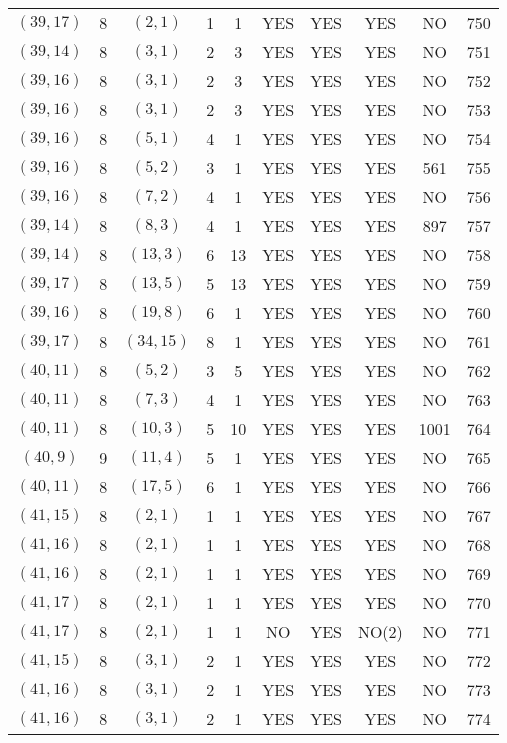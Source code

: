 \begin{longtable}{|c|c|c|c|c|c|c|c|c|c|}
$(39, 17)$ & 8 & $(2, 1)$ & 1 & 1 & YES & YES & YES & NO & 750\\
$(39, 14)$ & 8 & $(3, 1)$ & 2 & 3 & YES & YES & YES & NO & 751\\
$(39, 16)$ & 8 & $(3, 1)$ & 2 & 3 & YES & YES & YES & NO & 752\\
$(39, 16)$ & 8 & $(3, 1)$ & 2 & 3 & YES & YES & YES & NO & 753\\
$(39, 16)$ & 8 & $(5, 1)$ & 4 & 1 & YES & YES & YES & NO & 754\\
$(39, 16)$ & 8 & $(5, 2)$ & 3 & 1 & YES & YES & YES & 561 & 755\\
$(39, 16)$ & 8 & $(7, 2)$ & 4 & 1 & YES & YES & YES & NO & 756\\
$(39, 14)$ & 8 & $(8, 3)$ & 4 & 1 & YES & YES & YES & 897 & 757\\
$(39, 14)$ & 8 & $(13, 3)$ & 6 & 13 & YES & YES & YES & NO & 758\\
$(39, 17)$ & 8 & $(13, 5)$ & 5 & 13 & YES & YES & YES & NO & 759\\
$(39, 16)$ & 8 & $(19, 8)$ & 6 & 1 & YES & YES & YES & NO & 760\\
$(39, 17)$ & 8 & $(34, 15)$ & 8 & 1 & YES & YES & YES & NO & 761\\
$(40, 11)$ & 8 & $(5, 2)$ & 3 & 5 & YES & YES & YES & NO & 762\\
$(40, 11)$ & 8 & $(7, 3)$ & 4 & 1 & YES & YES & YES & NO & 763\\
$(40, 11)$ & 8 & $(10, 3)$ & 5 & 10 & YES & YES & YES & 1001 & 764\\
$(40, 9)$ & 9 & $(11, 4)$ & 5 & 1 & YES & YES & YES & NO & 765\\
$(40, 11)$ & 8 & $(17, 5)$ & 6 & 1 & YES & YES & YES & NO & 766\\
$(41, 15)$ & 8 & $(2, 1)$ & 1 & 1 & YES & YES & YES & NO & 767\\
$(41, 16)$ & 8 & $(2, 1)$ & 1 & 1 & YES & YES & YES & NO & 768\\
$(41, 16)$ & 8 & $(2, 1)$ & 1 & 1 & YES & YES & YES & NO & 769\\
$(41, 17)$ & 8 & $(2, 1)$ & 1 & 1 & YES & YES & YES & NO & 770\\
$(41, 17)$ & 8 & $(2, 1)$ & 1 & 1 & NO & YES & NO(2) & NO & 771\\
$(41, 15)$ & 8 & $(3, 1)$ & 2 & 1 & YES & YES & YES & NO & 772\\
$(41, 16)$ & 8 & $(3, 1)$ & 2 & 1 & YES & YES & YES & NO & 773\\
$(41, 16)$ & 8 & $(3, 1)$ & 2 & 1 & YES & YES & YES & NO & 774\\

\end{longtable}
